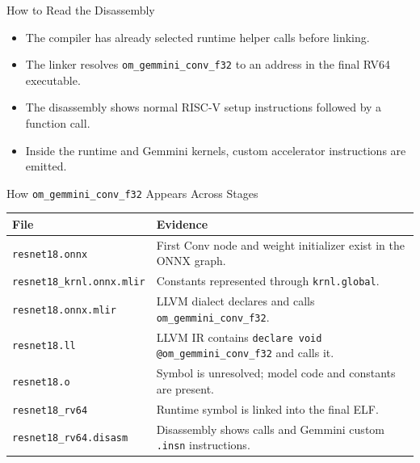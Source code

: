 \documentclass[aspectratio=169,10pt]{beamer}
\newcommand{\code}[1]{\texttt{\footnotesize #1}}
\begin{document}
\begin{frame}{How to Read the Disassembly}
  \begin{itemize}
    \item The compiler has already selected runtime helper calls before linking.
    \item The linker resolves \code{om\_gemmini\_conv\_f32} to an address in the final RV64 executable.
    \item The disassembly shows normal RISC-V setup instructions followed by a function call.
    \item Inside the runtime and Gemmini kernels, custom accelerator instructions are emitted.
  \end{itemize}
\end{frame}

\begin{frame}{How \code{om\_gemmini\_conv\_f32} Appears Across Stages}
  \scriptsize
  \begin{tabularx}{\textwidth}{@{}lX@{}}
    \toprule
    File & Evidence \\
    \midrule
    \code{resnet18.onnx} & First Conv node and weight initializer exist in the ONNX graph. \\
    \code{resnet18\_krnl.onnx.mlir} & Constants represented through \code{krnl.global}. \\
    \code{resnet18.onnx.mlir} & LLVM dialect declares and calls \code{om\_gemmini\_conv\_f32}. \\
    \code{resnet18.ll} & LLVM IR contains \code{declare void @om\_gemmini\_conv\_f32} and calls it. \\
    \code{resnet18.o} & Symbol is unresolved; model code and constants are present. \\
    \code{resnet18\_rv64} & Runtime symbol is linked into the final ELF. \\
    \code{resnet18\_rv64.disasm} & Disassembly shows calls and Gemmini custom \code{.insn} instructions. \\
    \bottomrule
  \end{tabularx}
\end{frame}
\end{document}
